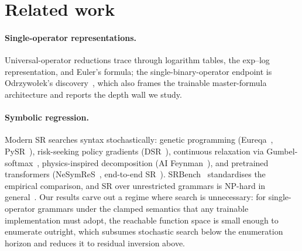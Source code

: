 \documentclass[11pt]{article}
\begin{document}
\section{Related work}

\paragraph{Single-operator representations.} Universal-operator
reductions trace through logarithm tables, the exp--log
representation, and Euler's formula; the single-binary-operator
endpoint is Odrzywo{\l}ek's discovery~\cite{odrzywolek2026eml}, which
also frames the trainable master-formula architecture and reports the
depth wall we study.

\paragraph{Symbolic regression.} Modern SR searches syntax
stochastically: genetic programming (Eureqa~\cite{schmidt2009},
PySR~\cite{cranmer2023pysr}), risk-seeking policy gradients
(DSR~\cite{petersen2021dsr}), continuous relaxation via
Gumbel-softmax~\cite{jang2017gumbel}, physics-inspired decomposition
(AI Feynman~\cite{udrescu2020feynman}), and pretrained transformers
(NeSymReS~\cite{biggio2021}, end-to-end
SR~\cite{kamienny2022}). SRBench~\cite{lacava2021} standardises the
empirical comparison, and SR over unrestricted grammars is NP-hard in
general~\cite{virgolin2022}. Our results carve out a regime where
search is unnecessary: for single-operator grammars under the clamped
semantics that any trainable implementation must adopt, the reachable
function space is small enough to enumerate outright, which subsumes
stochastic search below the enumeration horizon and reduces it to
residual inversion above.
\end{document}
